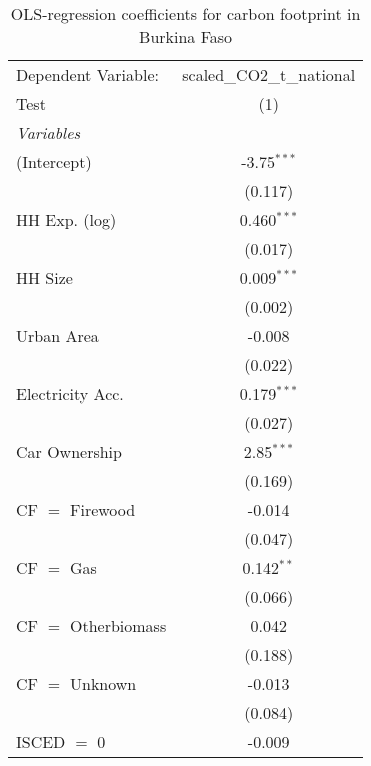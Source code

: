 
\begin{table}[htbp!]
   \centering
   \small
   \begin{adjustbox}{width = 1\textwidth, max height = 0.95\textheight, center}
      \begin{threeparttable}[b]
         \caption{\label{tab:OLS_2_BFA} OLS-regression coefficients for carbon footprint in Burkina Faso}
         \begin{tabular}{lc}
            \tabularnewline \midrule \midrule
            Dependent Variable: & scaled\_CO2\_t\_national\\     
            Test                & (1)\\  
            \midrule
            \emph{Variables}\\
            (Intercept)         & -3.75$^{***}$\\   
                                & (0.117)\\   
            HH Exp. (log)       & 0.460$^{***}$\\   
                                & (0.017)\\   
            HH Size             & 0.009$^{***}$\\   
                                & (0.002)\\   
            Urban Area          & -0.008\\   
                                & (0.022)\\   
            Electricity Acc.    & 0.179$^{***}$\\   
                                & (0.027)\\   
            Car Ownership       & 2.85$^{***}$\\   
                                & (0.169)\\   
            CF $=$ Firewood     & -0.014\\   
                                & (0.047)\\   
            CF $=$ Gas          & 0.142$^{**}$\\   
                                & (0.066)\\   
            CF $=$ Otherbiomass & 0.042\\   
                                & (0.188)\\   
            CF $=$ Unknown      & -0.013\\   
                                & (0.084)\\   
            ISCED $=$ 0         & -0.009\\   

\end{tabular}
\end{threeparttable}
\end{adjustbox}
\end{table}
